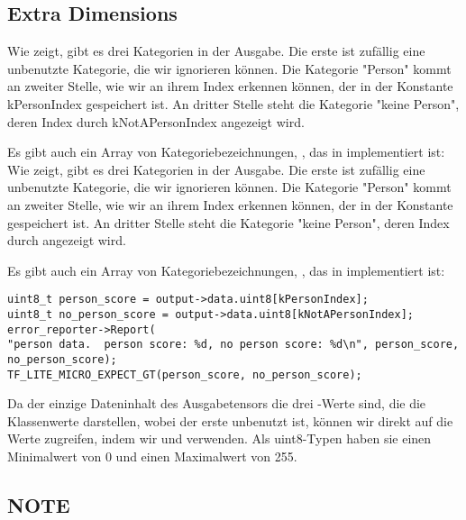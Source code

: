 \subsection{Extra Dimensions}

Wie  zeigt, gibt es drei Kategorien in der Ausgabe. Die erste ist zufällig eine unbenutzte Kategorie, die wir ignorieren können. Die Kategorie "Person" kommt an zweiter Stelle, wie wir an ihrem Index erkennen können, der in der Konstante kPersonIndex gespeichert ist. An dritter Stelle steht die Kategorie "keine Person", deren Index durch kNotAPersonIndex angezeigt wird.

Es gibt auch ein Array von Kategoriebezeichnungen, , das in  implementiert ist:
Wie  zeigt, gibt es drei Kategorien in der Ausgabe. Die erste ist zufällig eine unbenutzte Kategorie, die wir ignorieren können. Die Kategorie "Person" kommt an zweiter Stelle, wie wir an ihrem Index erkennen können, der in der Konstante  gespeichert ist. An dritter Stelle steht die Kategorie "keine Person", deren Index durch  angezeigt wird.

Es gibt auch ein Array von Kategoriebezeichnungen, , das in  implementiert ist:

\begin{code}
    \begin{lstlisting}
uint8_t person_score = output->data.uint8[kPersonIndex];
uint8_t no_person_score = output->data.uint8[kNotAPersonIndex];
error_reporter->Report(
"person data.  person score: %d, no person score: %d\n", person_score,
no_person_score);
TF_LITE_MICRO_EXPECT_GT(person_score, no_person_score);
  \end{lstlisting}
\end{code}

Da der einzige Dateninhalt des Ausgabetensors die drei -Werte sind, die die Klassenwerte darstellen, wobei der erste unbenutzt ist, können wir direkt auf die Werte zugreifen, indem wir  und  verwenden. Als uint8-Typen haben sie einen Minimalwert von 0 und einen Maximalwert von 255.





\subsection{NOTE}

